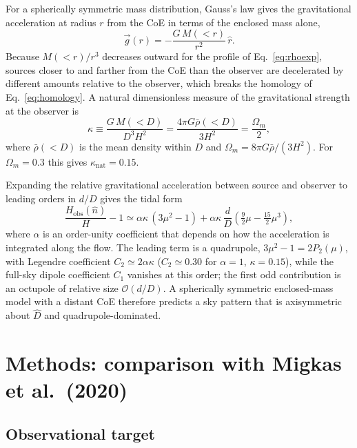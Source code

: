 \documentclass[11pt,letterpaper]{article}
\numberwithin{equation}{section}
\begin{document}
For a spherically symmetric mass distribution, Gauss's law gives the
gravitational acceleration at radius $r$ from the CoE in terms of the enclosed
mass alone,
\begin{equation}
  \vec g(r) = -\frac{G\,M(<r)}{r^2}\,\hat r .
  \label{eq:gauss}
\end{equation}
Because $M(<r)/r^3$ decreases outward for the profile of
Eq.~\eqref{eq:rhoexp}, sources closer to and farther from the CoE than the
observer are decelerated by different amounts relative to the observer, which
breaks the homology of Eq.~\eqref{eq:homology}. A natural dimensionless
measure of the gravitational strength at the observer is
\begin{equation}
  \kappa \equiv \frac{G\,M(<D)}{D^3 H^2}
  = \frac{4\pi G\bar\rho(<D)}{3H^2}
  = \frac{\Omega_m}{2},
  \label{eq:kappa}
\end{equation}
where $\bar\rho(<D)$ is the mean density within $D$ and
$\Omega_m=8\pi G\bar\rho/(3H^2)$. For $\Omega_m=0.3$ this gives
$\kappa_{\mathrm{nat}}=0.15$.

Expanding the relative gravitational acceleration between source and observer
to leading orders in $d/D$ gives the tidal form
\begin{equation}
  \frac{H_{\mathrm{obs}}(\hat n)}{H} - 1
  \simeq \alpha\kappa\,(3\mu^2-1)
  + \alpha\kappa\,\frac{d}{D}\left(\tfrac{9}{2}\mu - \tfrac{15}{2}\mu^3\right),
  \label{eq:tidal}
\end{equation}
where $\alpha$ is an order-unity coefficient that depends on how the
acceleration is integrated along the flow. The leading term is a quadrupole,
$3\mu^2-1=2P_2(\mu)$, with Legendre coefficient $C_2\simeq2\alpha\kappa$
($C_2\simeq0.30$ for $\alpha=1$, $\kappa=0.15$), while the full-sky dipole
coefficient $C_1$ vanishes at this order; the first odd contribution is an
octupole of relative size $\mathcal O(d/D)$. A spherically symmetric
enclosed-mass model with a distant CoE therefore predicts a sky pattern that is
axisymmetric about $\hat D$ and quadrupole-dominated.

\section{Methods: comparison with Migkas et al.\ (2020)}
\label{sec:methods}

\subsection{Observational target}
\end{document}

